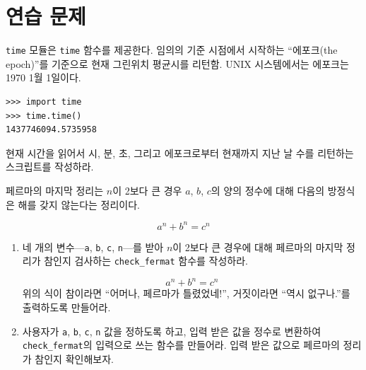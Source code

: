 \documentclass[10pt]{book}
\begin{document}
\section{연습 문제}

\begin{exercise}

{\tt time} 모듈은 {\tt time} 함수를 제공한다.  임의의 기준 시점에서
시작하는 ``에포크(the epoch)''를 기준으로 현재 그린위치 평균시를
리턴함. UNIX 시스템에서는 에포크는 1970 1월 1일이다.


\begin{verbatim}
>>> import time
>>> time.time()
1437746094.5735958
\end{verbatim}

현재 시간을 읽어서 시, 분, 초, 그리고 에포크로부터 현재까지 지난 날
수를 리턴하는 스크립트를 작성하라.

\end{exercise}


\begin{exercise}

페르마의 마지막 정리는 $n$이 2보다 큰 경우 $a$, $b$, $c$의 양의 정수에
대해 다음의 방정식은 해를 갖지 않는다는 정리이다.

\[ a^n + b^n = c^n \]
%

\begin{enumerate}

\item 네 개의 변수---{\tt a}, {\tt b}, {\tt c}, {\tt n}---를 받아 $n$이
  2보다 큰 경우에 대해 페르마의 마지막 정리가 참인지 검사하는
  \verb"check_fermat" 함수를 작성하라. 

\[a^n + b^n = c^n \]
%
위의 식이 참이라면 ``어머나, 페르마가 틀렸었네!'', 거짓이라면 ``역시
없구나.''를 출력하도록 만들어라.


\item 사용자가 {\tt a}, {\tt b}, {\tt c}, {\tt n} 값을 정하도록 하고,
  입력 받은 값을 정수로 변환하여 \verb"check_fermat"의 입력으로 쓰는
  함수를 만들어라.  입력 받은 값으로 페르마의 정리가 참인지
  확인해보자.

\end{enumerate}

\end{exercise}
\end{document}
